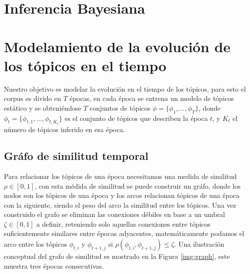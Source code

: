 \documentclass[letterpaper,12pt,oneside]{book} %
\begin{document}
\section{Inferencia Bayesiana}

\section{Modelamiento de la evolución de los tópicos en el tiempo}

Nuestro objetivo es modelar la evolución en el tiempo de los tópicos, para esto el corpus es divido en $T$ épocas, en cada época se entrena un modelo de tópicos estático y se obteniéndose $T$ conjuntos de tópicos $\phi=\{\phi_{1}, \ldots, \phi_{T}\}$, donde $\phi_{t}=\{\phi_{t,1}, \ldots, \phi_{t,K_{t}}\}$ es el conjunto de tópicos que describen la época $t$, y $K_{t}$ el número de tópicos inferido en esa época.

\subsection{Gráfo de similitud temporal}
Para relacionar los tópicos de una época necesitamos una medida de similitud $\rho \in [0,1]$, con esta médida de similitud se puede construir un gráfo, donde los nodos son los tópicos de una época y los arcos relacionan tópicos de una época con la siguiente, siendo el peso del arco la similitud entre los tópicos. Una vez construido el grafo se eliminan las conexiones débiles en base a un umbral $\zeta \in [0,1]$ a definir, reteniendo solo aquellas conexiones entre tópicos suficientemente similares entre épocas adyacentes, matemáticamente podamos el arco entre los tópicos $\phi_{t,i}$ y $\phi_{t+1,j}$ si $\rho(\phi_{t,i}, \phi_{t+1,j})\leq \zeta$. Una ilustración conceptual del grafo de similitud es mostrado en la Figura \ref{img:graph}, este muestra tres épocas consecutivas.
\end{document}
